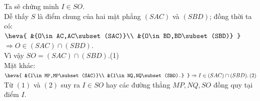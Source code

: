 \begin{ex}
{		 Ta sẽ chứng minh $ I\in SO$.\\
		Dễ thấy $ S$ là điểm  chung của hai mặt phẳng $ (SAC)$ và $ (SBD)$; đồng thời ta có:\\
		 $\heva{
		 &{O\in AC,AC\subset (SAC)}\\
		&{O\in  BD,BD\subset (SBD)}
		}$ \\$\Rightarrow O\in (SAC)\cap  (SBD).\,$\\
		Vì vậy $  SO=(SAC)\cap (SBD)$.(1)\\
		Mặt khác: $\heva{ 
		&{I\in MP,MP\subset (SAC)}\\ 
		 &{I\in NQ,NQ\subset (SBD).}
		}\Rightarrow I\in  (SAC)\cap (SBD).\,(2)$\\
	 Từ $(1)$ và $(2)$ suy ra $ I\in SO$ hay các đường thẳng $ MP,NQ,SO$ đồng quy tại điểm $ I$.}
\end{ex}


